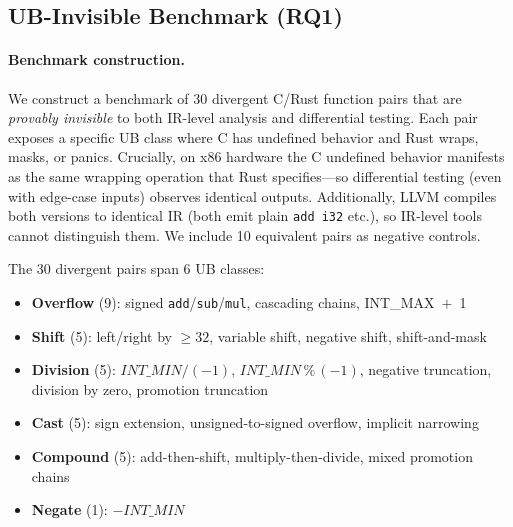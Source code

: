 \documentclass[10pt,a4paper]{article}
\begin{document}
\subsection{UB-Invisible Benchmark (RQ1)}\label{sec:eval-ub}

\paragraph{Benchmark construction.}
We construct a benchmark of 30 divergent C/Rust function pairs that are
\emph{provably invisible} to both IR-level analysis and differential
testing.  Each pair exposes a specific UB class where C has undefined
behavior and Rust wraps, masks, or panics.  Crucially, on x86 hardware
the C undefined behavior manifests as the same wrapping operation that
Rust specifies---so differential testing (even with edge-case inputs)
observes identical outputs.  Additionally, LLVM compiles both versions
to identical IR (both emit plain \texttt{add i32} etc.), so IR-level
tools cannot distinguish them.  We include 10 equivalent pairs as
negative controls.

The 30 divergent pairs span 6 UB classes:
\begin{itemize}[nosep]
  \item \textbf{Overflow} (9): signed \texttt{add}/\texttt{sub}/\texttt{mul},
    cascading chains, INT\_MAX~$+$~1
  \item \textbf{Shift} (5): left/right by ${\geq}32$, variable shift,
    negative shift, shift-and-mask
  \item \textbf{Division} (5): $\mathit{INT\_MIN}/(-1)$,
    $\mathit{INT\_MIN}\,\%\,(-1)$, negative truncation, division by zero,
    promotion truncation
  \item \textbf{Cast} (5): sign extension, unsigned-to-signed overflow,
    implicit narrowing
  \item \textbf{Compound} (5): add-then-shift, multiply-then-divide,
    mixed promotion chains
  \item \textbf{Negate} (1): $-\mathit{INT\_MIN}$
\end{itemize}
\end{document}
